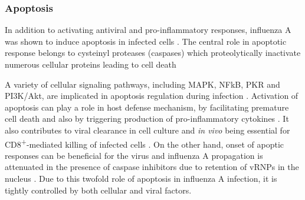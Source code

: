 		\subsubsection{Apoptosis}
		
		In addition to activating antiviral and pro-inflammatory responses, influenza A was shown to induce apoptosis in infected cells \parencite{Fesq1994, Hinshaw1994, Mori1995, Brydon2005}. The central role in apoptotic response belongs to cysteinyl proteases (caspases) which proteolytically inactivate numerous cellular proteins leading to cell death \parencite{Cohen1997, Thornberry1998}	
		
		A variety of cellular signaling pathways, including \gls{MAPK}, \gls{NFkB}, \gls{PKR} and \gls{PI3K}/Akt, are implicated in apoptosis regulation during infection \parencite{Gil2000, Xing2010, Lu2010}. Activation of apoptosis can play a role in host defense mechanism, by facilitating premature cell death and also by triggering production of pro-inflammatory cytokines \parencite{Julkunen2000}. It also contributes to viral clearance in cell culture and \textit{in vivo} being essential for CD8\textsuperscript{+}-mediated killing of infected cells \parencite{Ishikawa2005, Brincks2008}. On the other hand, onset of apoptic responses can be beneficial for the virus and influenza A propagation is attenuated in the presence of caspase inhibitors due to retention of \glspl{vRNP} in the nucleus \parencite{Wurzer2003}. Due to this twofold role of apoptosis in influenza A infection, it is tightly controlled by both cellular and viral factors.
			
		
